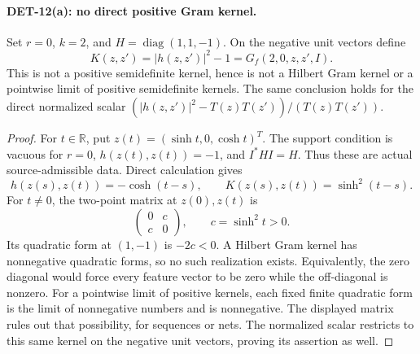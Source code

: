 \documentclass[11pt,a4paper]{article}
\begin{document}
\paragraph{DET-12(a): no direct positive Gram kernel.}
Set \(r=0\), \(k=2\), and \(H=\operatorname{diag}(1,1,-1)\).
On the negative unit vectors define
\[
 K(z,z')=|h(z,z')|^2-1=G_f(2,0,z,z',I).
\]
This is not a positive semidefinite kernel, hence is not a Hilbert Gram
kernel or a pointwise limit of positive semidefinite kernels.
The same conclusion holds for the direct normalized scalar
\((|h(z,z')|^2-T(z)T(z'))/(T(z)T(z'))\).
\begin{proof}
For \(t\in\mathbb R\), put \(z(t)=(\sinh t,0,\cosh t)^T\).
The support condition is vacuous for \(r=0\),
\(h(z(t),z(t))=-1\), and \(I^*HI=H\). Thus these are actual
source-admissible data. Direct calculation gives
\[
 h(z(s),z(t))=-\cosh(t-s),\qquad
 K(z(s),z(t))=\sinh^2(t-s).
\]
For \(t\ne0\), the two-point matrix at \(z(0),z(t)\) is
\[
 \begin{pmatrix}0&c\\c&0\end{pmatrix},\qquad c=\sinh^2t>0.
\]
Its quadratic form at \((1,-1)\) is \(-2c<0\).
A Hilbert Gram kernel has nonnegative quadratic forms, so no such
realization exists. Equivalently, the zero diagonal would force every
feature vector to be zero while the off-diagonal is nonzero.
For a pointwise limit of positive kernels, each fixed finite quadratic
form is the limit of nonnegative numbers and is nonnegative.
The displayed matrix rules out that possibility, for sequences or nets.
The normalized scalar restricts to this same kernel on the negative
unit vectors, proving its assertion as well.
\end{proof}
\end{document}
